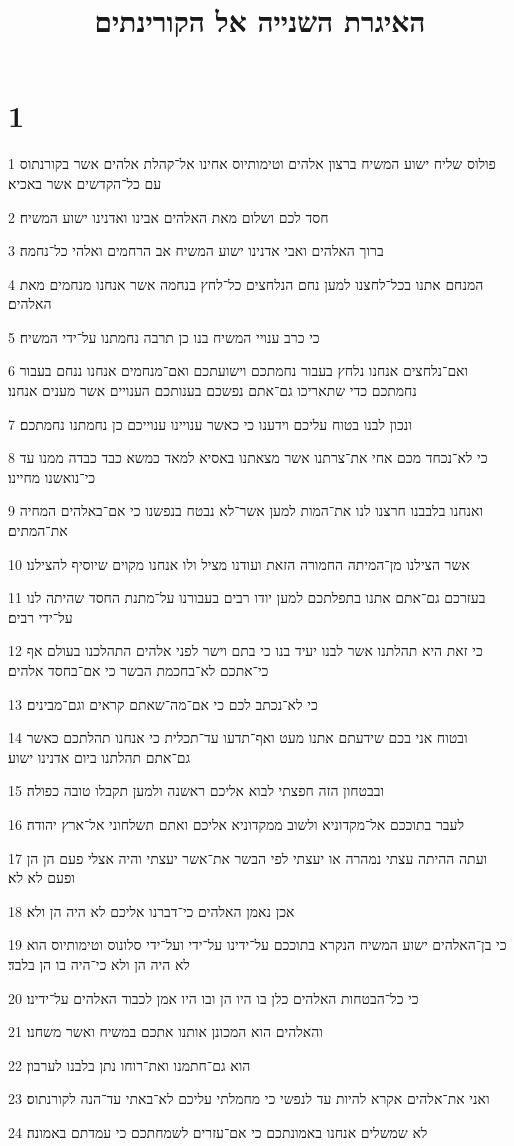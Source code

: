 

\title{האיגרת השנייה אל הקורינתים}


\chapter{1}

\par 1 פולוס שליח ישוע המשיח ברצון אלהים וטימותיוס אחינו אל־קהלת אלהים אשר בקורנתוס עם כל־הקדשים אשר באכיא׃
\par 2 חסד לכם ושלום מאת האלהים אבינו ואדנינו ישוע המשיח׃
\par 3 ברוך האלהים ואבי אדנינו ישוע המשיח אב הרחמים ואלהי כל־נחמה׃
\par 4 המנחם אתנו בכל־לחצנו למען נחם הנלחצים כל־לחץ בנחמה אשר אנחנו מנחמים מאת האלהים׃
\par 5 כי כרב ענויי המשיח בנו כן תרבה נחמתנו על־ידי המשיח׃
\par 6 ואם־נלחצים אנחנו נלחץ בעבור נחמתכם וישועתכם ואם־מנחמים אנחנו ננחם בעבור נחמתכם כדי שתאריכו גם־אתם נפשכם בענותכם הענויים אשר מענים אנחנו׃
\par 7 ונכון לבנו בטוח עליכם וידענו כי כאשר ענויינו ענוייכם כן נחמתנו נחמתכם׃
\par 8 כי לא־נכחד מכם אחי את־צרתנו אשר מצאתנו באסיא למאד כמשא כבד כבדה ממנו עד כי־נואשנו מחיינו׃
\par 9 ואנחנו בלבבנו חרצנו לנו את־המות למען אשר־לא נבטח בנפשנו כי אם־באלהים המחיה את־המתים׃
\par 10 אשר הצילנו מן־המיתה החמורה הזאת ועודנו מציל ולו אנחנו מקוים שיוסיף להצילנו׃
\par 11 בעזרכם גם־אתם אתנו בתפלתכם למען יודו רבים בעבורנו על־מתנת החסד שהיתה לנו על־ידי רבים׃
\par 12 כי זאת היא תהלתנו אשר לבנו יעיד בנו כי בתם וישר לפני אלהים התהלכנו בעולם אף כי־אתכם לא־בחכמת הבשר כי אם־בחסד אלהים׃
\par 13 כי לא־נכתב לכם כי אם־מה־שאתם קראים וגם־מבינים׃
\par 14 ובטוח אני בכם שידעתם אתנו מעט ואף־תדעו עד־תכלית כי אנחנו תהלתכם כאשר גם־אתם תהלתנו ביום אדנינו ישוע׃
\par 15 ובבטחון הזה חפצתי לבוא אליכם ראשנה ולמען תקבלו טובה כפולה׃
\par 16 לעבר בתוככם אל־מקדוניא ולשוב ממקדוניא אליכם ואתם תשלחוני אל־ארץ יהודה׃
\par 17 ועתה ההיתה עצתי נמהרה או יעצתי לפי הבשר את־אשר יעצתי והיה אצלי פעם הן הן ופעם לא לא׃
\par 18 אכן נאמן האלהים כי־דברנו אליכם לא היה הן ולא׃
\par 19 כי בן־האלהים ישוע המשיח הנקרא בתוככם על־ידינו על־ידי ועל־ידי סלונוס וטימותיוס הוא לא היה הן ולא כי־היה בו הן בלבד׃
\par 20 כי כל־הבטחות האלהים כלן בו היו הן ובו היו אמן לכבוד האלהים על־ידינו׃
\par 21 והאלהים הוא המכונן אותנו אתכם במשיח ואשר משחנו׃
\par 22 הוא גם־חתמנו ואת־רוחו נתן בלבנו לערבון׃
\par 23 ואני את־אלהים אקרא להיות עד לנפשי כי מחמלתי עליכם לא־באתי עד־הנה לקורנתוס׃
\par 24 לא שמשלים אנחנו באמונתכם כי אם־עזרים לשמחתכם כי עמדתם באמונה׃

